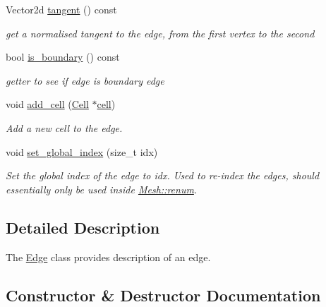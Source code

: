 \begin{DoxyCompactItemize}
Vector2d \hyperlink{group__Mesh_ga3362368ff28f1e128bbc46615fd24cd7}{tangent} () const
\begin{DoxyCompactList}\small\item\em get a normalised tangent to the edge, from the first vertex to the second \end{DoxyCompactList}\item 
bool \hyperlink{group__Mesh_ga10424f4b99793ab359b5dd099f9255ee}{is\+\_\+boundary} () const
\begin{DoxyCompactList}\small\item\em getter to see if edge is boundary edge \end{DoxyCompactList}\item 
\mbox{\label{classHArDCore2D_1_1Edge_a364bacf89dfa0be36abbbadbb2dd4f78}} 
void \hyperlink{classHArDCore2D_1_1Edge_a364bacf89dfa0be36abbbadbb2dd4f78}{add\+\_\+cell} (\hyperlink{classHArDCore2D_1_1Cell}{Cell} $\ast$\hyperlink{classHArDCore2D_1_1Edge_ad4be0bfb981ccf2c1e02e870772dbdc3}{cell})
\begin{DoxyCompactList}\small\item\em Add a new cell to the edge. \end{DoxyCompactList}\item 
\mbox{\label{classHArDCore2D_1_1Edge_a150b8b31cd1b608d6ce8b020227a6db2}} 
void \hyperlink{classHArDCore2D_1_1Edge_a150b8b31cd1b608d6ce8b020227a6db2}{set\+\_\+global\+\_\+index} (size\+\_\+t idx)
\begin{DoxyCompactList}\small\item\em Set the global index of the edge to idx. Used to re-\/index the edges, should essentially only be used inside \hyperlink{classHArDCore2D_1_1Mesh_af77873bbc892a7a5b37bf4773c55aefc}{Mesh\+::renum}. \end{DoxyCompactList}\end{DoxyCompactItemize}


\subsection{Detailed Description}
The \hyperlink{classHArDCore2D_1_1Edge}{Edge} class provides description of an edge. 

\subsection{Constructor \& Destructor Documentation}
\mbox{\label{classHArDCore2D_1_1Edge_a1bca27244cfcd45e24e0b7485f148ddf}} 
